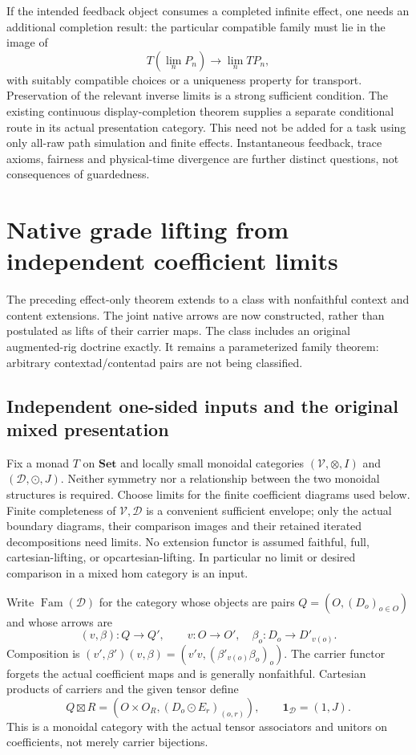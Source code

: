 \documentclass[11pt]{article}
\newcommand{\Set}{\mathbf{Set}}
\begin{document}
If the intended feedback object consumes a completed infinite effect, one needs an additional completion result: the particular compatible family must lie in the image of
\[
 T(\lim_nP_n)\longrightarrow\lim_n TP_n,
\]
with suitably compatible choices or a uniqueness property for transport. Preservation of the relevant inverse limits is a strong sufficient condition. The existing continuous display-completion theorem supplies a separate conditional route in its actual presentation category. This need not be added for a task using only all-raw path simulation and finite effects. Instantaneous feedback, trace axioms, fairness and physical-time divergence are further distinct questions, not consequences of guardedness.

\section{Native grade lifting from independent coefficient limits}\label{sec:grade-lifting}

The preceding effect-only theorem extends to a class with nonfaithful context and content extensions. The joint native arrows are now constructed, rather than postulated as lifts of their carrier maps. The class includes an original augmented-rig doctrine exactly. It remains a parameterized family theorem: arbitrary contextad/contentad pairs are not being classified.

\subsection{Independent one-sided inputs and the original mixed presentation}

Fix a monad $T$ on $\Set$ and locally small monoidal categories $(\mathcal V,\otimes,I)$ and $(\mathcal D,\odot,J)$. Neither symmetry nor a relationship between the two monoidal structures is required. Choose limits for the finite coefficient diagrams used below. Finite completeness of $\mathcal V,\mathcal D$ is a convenient sufficient envelope; only the actual boundary diagrams, their comparison images and their retained iterated decompositions need limits. No extension functor is assumed faithful, full, cartesian-lifting, or opcartesian-lifting. In particular no limit or desired comparison in a mixed hom category is an input.

Write $\operatorname{Fam}(\mathcal D)$ for the category whose objects are pairs $Q=(O,(D_o)_{o\in O})$ and whose arrows are
\[
 (v,\beta):Q\longrightarrow Q',\qquad
 v:O\to O',\quad \beta_o:D_o\to D'_{v(o)}.
\]
Composition is $(v',\beta')(v,\beta)=(v'v,(\beta'_{v(o)}\beta_o)_o)$. The carrier functor forgets the actual coefficient maps and is generally nonfaithful. Cartesian products of carriers and the given tensor define
\[
 Q\boxtimes R=(O\times O_R,(D_o\odot E_r)_{(o,r)}),\qquad
 \mathbf 1_{\mathcal D}=(1,J).
\tag{GW}\label{eq:graded-writer}
\]
This is a monoidal category with the actual tensor associators and unitors on coefficients, not merely carrier bijections.
\end{document}
